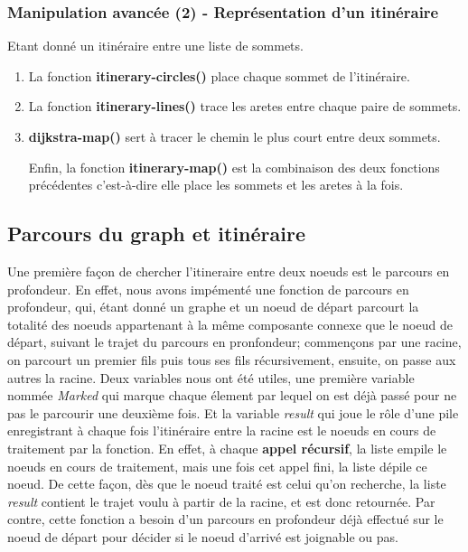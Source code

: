 \documentclass[french]{article}
\begin{document}
\subsubsection{Manipulation avancée (2) - Représentation d'un itinéraire}
Etant donné un itinéraire entre une liste de sommets.
\begin{enumerate}
\item La fonction \textbf{itinerary-circles()} place chaque sommet de l'itinéraire. 
\item La fonction \textbf{itinerary-lines()} trace les aretes entre chaque paire de sommets. 
\item \textbf{dijkstra-map()} sert à tracer le chemin le plus court entre deux sommets.

Enfin, la fonction \textbf{itinerary-map()} est la combinaison des deux fonctions précédentes c'est-à-dire elle place les sommets et les aretes à la fois.
\end{enumerate}

\subsection{Parcours du graph et itinéraire}
Une première façon de chercher l'itineraire entre deux noeuds est le parcours en profondeur. En effet, nous avons impémenté une fonction de parcours en profondeur, qui, étant donné un graphe et un noeud de départ parcourt la totalité des noeuds appartenant à la même composante connexe que le noeud de départ, suivant le trajet du parcours en pronfondeur; commençons par une racine, on parcourt un premier fils puis tous ses fils récursivement, ensuite, on passe aux autres la racine. Deux variables nous ont été utiles, une première variable nommée \textit{Marked} qui marque chaque élement par lequel on est déj\`a passé pour ne pas le parcourir une deuxième fois. Et la variable \textit{result} qui joue le rôle d'une pile enregistrant à chaque fois l'itinéraire entre la racine est le noeuds en cours de traitement par la fonction. En effet, à chaque \textbf{appel récursif}, la liste empile le noeuds en cours de traitement, mais une fois cet appel fini, la liste dépile ce noeud. De cette façon, dès que le noeud traité est celui qu'on recherche, la liste \textit{result} contient le trajet voulu à partir de la racine, et est donc retournée. Par contre, cette fonction a besoin d'un parcours en profondeur déj\`a effectué sur le noeud de départ pour décider si le noeud d'arrivé est joignable ou pas.
\end{document}
